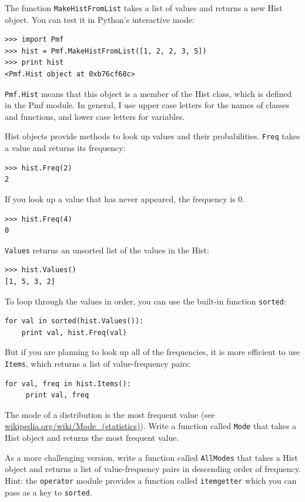 \documentclass[12pt]{book}
\begin{document}
The function {\tt MakeHistFromList} takes a list of values and
returns a new Hist object.  You can test it in Python's interactive
mode:

\begin{verbatim}
>>> import Pmf
>>> hist = Pmf.MakeHistFromList([1, 2, 2, 3, 5])
>>> print hist
<Pmf.Hist object at 0xb76cf68c>
\end{verbatim}

{\tt Pmf.Hist} means that this object is a member of the Hist class,
which is defined in the Pmf module.  In general, I use upper case
letters for the names of classes and functions, and lower case letters
for variables.

Hist objects provide methods to look up values and their
probabilities.  {\tt Freq} takes a value and returns its frequency:

\begin{verbatim}
>>> hist.Freq(2)
2
\end{verbatim}

If you look up a value that has never appeared, the frequency is 0.

\begin{verbatim}
>>> hist.Freq(4)
0
\end{verbatim}

{\tt Values} returns an unsorted list of the values in the Hist:

\begin{verbatim}
>>> hist.Values()
[1, 5, 3, 2]
\end{verbatim}

To loop through the values in order, you can use the built-in function
{\tt sorted}:

\begin{verbatim}
for val in sorted(hist.Values()):
    print val, hist.Freq(val)
\end{verbatim}

But if you are planning to look up all of the frequencies, it is more
efficient to use {\tt Items}, which returns a list of value-frequency
pairs:

\begin{verbatim}
for val, freq in hist.Items():
     print val, freq
\end{verbatim}

\begin{ex}

The mode of a distribution is the most frequent value (see
\url{wikipedia.org/wiki/Mode_(statistics)}).  Write a function called
    {\tt Mode} that takes a Hist object and returns the most frequent
    value.

As a more challenging version, write a function called {\tt AllModes}
that takes a Hist object and returns a list of value-frequency
pairs in descending order of frequency.  Hint: the {\tt operator}
module provides a function called {\tt itemgetter} which you can
pass as a key to {\tt sorted}.

\end{ex}
\end{document}
